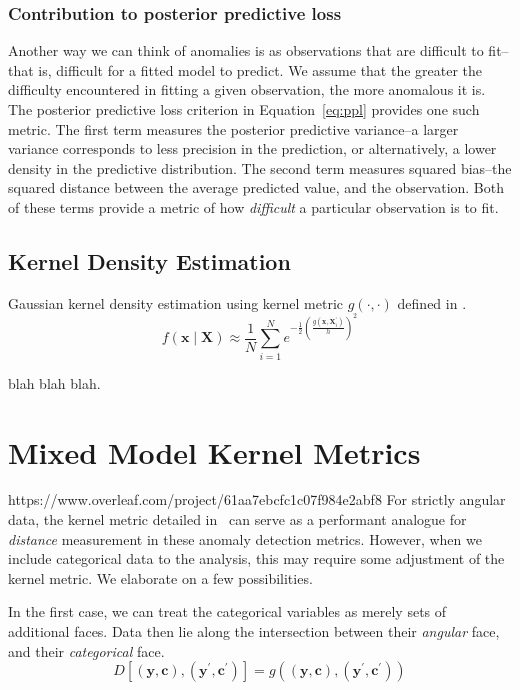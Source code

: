\subsubsection{Contribution to posterior predictive loss}
Another way we can think of anomalies is as observations that are difficult to fit--that is, difficult
    for a fitted model to predict.  We assume that the greater the difficulty encountered in fitting a
    given observation, the more anomalous it is.  The posterior predictive loss criterion in
    Equation~\ref{eq:ppl} provides one such metric.  The first term measures the posterior predictive
    variance--a larger variance corresponds to less precision in the prediction, or alternatively, a lower
    density in the predictive distribution.  The second term measures squared bias--the squared distance
    between the average predicted value, and the observation.  Both of these terms provide a metric of
    how \emph{difficult} a particular observation is to fit.

\subsection{Kernel Density Estimation}

Gaussian kernel density estimation using kernel metric $g(\cdot,\cdot)$ defined in \cite{trubey:pg}.
\begin{equation}
    f(\bm{x}\mid \bm{X}) \approx \frac{1}{N}\sum_{i = 1}^Ne^{-\frac{1}{2}\left(\frac{g(\bm{x},\bm{X}_i^{\prime})}{h}\right)^2}
\end{equation}

blah blah blah.

\section{Mixed Model Kernel Metrics}https://www.overleaf.com/project/61aa7ebcfc1c07f984e2abf8
For strictly angular data, the kernel metric detailed in~\cite{trubey:pg} can serve as a 
  performant analogue for \emph{distance} measurement in these anomaly detection metrics.  However, 
  when we include categorical data to the analysis, this may require some adjustment of the kernel 
  metric.  We elaborate on a few possibilities.


In the first case, we can treat the categorical variables as merely sets of additional faces.  Data then lie 
    along the intersection between their \emph{angular} face, and their \emph{categorical} face.  
\begin{equation}
    D\left[(\bm{y},\bm{c}), (\bm{y}^{\prime}, \bm{c}^{\prime})\right] = g\left((\bm{y},\bm{c}), (\bm{y}^{\prime}, \bm{c}^{\prime})\right)
\end{equation}

